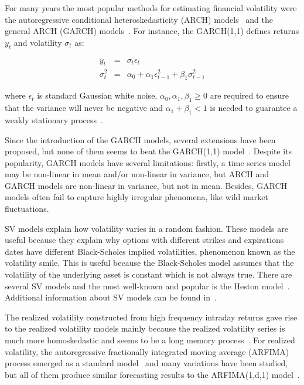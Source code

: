 For many years the most popular methods for estimating financial
volatility were the autoregressive conditional heteroskedasticity
(ARCH) models~\cite{engle1982} and the general ARCH (GARCH)
models~\cite{bollerslev1986}. For instance, the GARCH(1,1) defines
returns $y_t$ and volatility $\sigma_t$ as:

\begin{eqnarray*}
    y_t &=& \sigma_t \epsilon_t \\
     \sigma_t^2 &=& \alpha_0 + \alpha_1 \epsilon_{t-1}^2 + \beta_1
     \sigma_{t-1}^2
\end{eqnarray*}

\noindent where $\epsilon_t$ is standard Gaussian white noise,
$\alpha_0,\alpha_1,\beta_1 \geq 0$ are required to ensure that the
variance will never be negative and $\alpha_1+\beta_1 <1$ is needed to
guarantee a weakly stationary process~\cite{nelson1990}.

Since the introduction of the GARCH models, several extensions have been proposed, but none of them seems to beat the GARCH(1,1) model~\cite{lunde+hansen2005}. Despite its popularity, GARCH models have several limitations: firstly, a time series model may be non-linear in mean and/or non-linear in variance, but ARCH and GARCH models are non-linear in variance, but not in mean. Besides, GARCH models often fail to capture highly irregular phenomena, like wild market fluctuations.  

SV models explain how volatility varies in a random fashion. These models are useful because they explain why options with different strikes and expirations dates have different Black-Scholes implied volatilities, phenomenon known as the volatility smile. This is useful because the Black-Scholes model assumes that the volatility of the underlying asset is constant which is not always true. There are several SV models and the most well-known and popular is the Heston model~\cite{heston1993}. Additional information about SV models can be found in~\cite{shephard1995}. 

The realized volatility constructed from high frequency intraday returns gave rise to the realized volatility models mainly because the realized volatility series is much more homoskedastic and seems to be a long memory process~\cite{andersonetal2003}. For realized volatility, the autoregressive fractionally integrated moving average (ARFIMA) process emerged as a standard model~\cite{chenetal2010} and many variations have been studied, but all of them produce similar forecasting results to the ARFIMA(1,d,1) model~\cite{koopmanetal2005}.  

